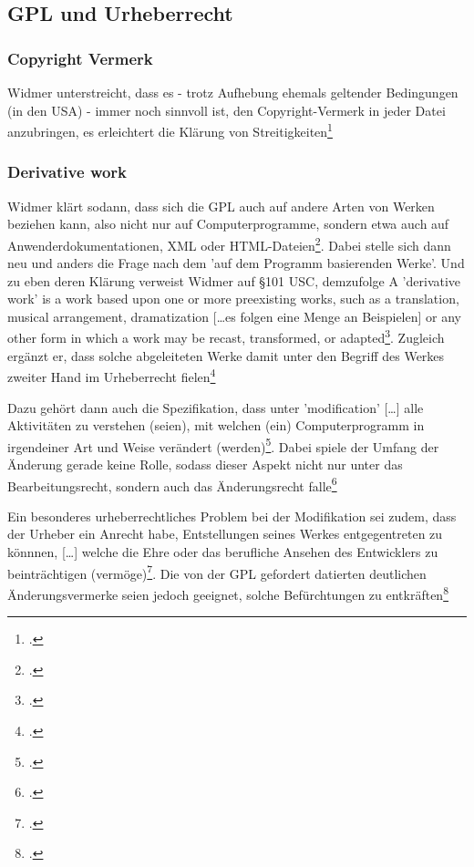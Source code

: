 \documentclass[DIV=calc,BCOR=5mm,11pt,headings=small,oneside,abstract=true, toc=bib]{scrartcl}
\begin{document}
\subsection{GPL und Urheberrecht}

\subsubsection{Copyright Vermerk}
Widmer unterstreicht, dass es - trotz Aufhebung ehemals geltender Bedingungen
(in den USA) - immer noch sinnvoll ist, den Copyright-Vermerk in jeder Datei
anzubringen, es erleichtert die Klärung von
Streitigkeiten\footcite[vgl.][107]{Widmer2003a}

\subsubsection{Derivative work}

Widmer klärt sodann, dass sich die GPL auch auf andere Arten von Werken
beziehen kann, also nicht nur auf \glqq{}Computerprogramme\grqq{}, sondern etwa
auch auf \glqq{}Anwenderdokumentationen, XML oder
HTML-Dateien\grqq{}\footcite[vgl.][114]{Widmer2003a}.  Dabei stelle sich dann
neu und anders die Frage nach dem 'auf dem Programm basierenden Werke'. Und zu
eben deren Klärung verweist Widmer auf §101 USC, demzufolge \glqq{}A
'derivative work' is a work based upon one or more preexisting works,
such as a translation, musical arrangement, dramatization [\ldots es
folgen eine Menge an Beispielen] or any other form in which a work may be
recast, transformed, or adapted\grqq{}\footcite[vgl.][114 Anm.
540]{Widmer2003a}. Zugleich ergänzt er, dass solche abgeleiteten Werke damit
unter den Begriff des \glqq{}Werkes zweiter Hand\grqq{} im Urheberrecht
fielen\footcite[vgl.][114f]{Widmer2003a}

Dazu gehört dann auch die Spezifikation, dass \glqq{}unter 'modification'
[\ldots] alle Aktivitäten zu verstehen (seien), mit welchen (ein)
Computerprogramm in irgendeiner Art und Weise verändert
(werden)\grqq{}\footcite[vgl.][123]{Widmer2003a}. Dabei spiele der Umfang der
Änderung gerade keine Rolle, sodass dieser Aspekt nicht nur unter das
\glqq{}Bearbeitungsrecht\grqq{}, sondern auch das \glqq{}Änderungsrecht\grqq{}
falle\footcite[vgl.][124]{Widmer2003a}

Ein besonderes urheberrechtliches Problem bei der Modifikation sei zudem, dass
der Urheber ein Anrecht habe, \glqq{}Entstellungen\grqq{} seines Werkes
entgegentreten zu könnnen, \glqq{}[\ldots] welche die Ehre oder das
berufliche Ansehen des Entwicklers zu beinträchtigen
(vermöge)\grqq{}\footcite[vgl.][135]{Widmer2003a}. Die von der GPL gefordert
\glqq{}datierten deutlichen Änderungsvermerke\grqq{} seien jedoch geeignet,
solche Befürchtungen zu entkräften\footcite[vgl.][136]{Widmer2003a}
\end{document}
